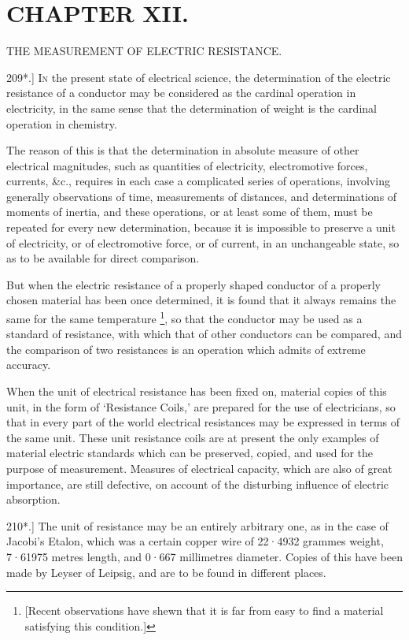 \documentclass[12pt,oneside]{book}[2021/10/04]
\let\oldfootnote\footnote
\renewcommand\footnote[1]{%
\oldfootnote{\hspace{0.14em}#1}}
\newcommand{\Heading}{\centering\normalfont}
\newcommand{\Chapter}[1]{\section*{\large\Heading #1}}
\newcommand{\Subheading}[1]{\begin{center}\small #1 \end{center}}
\newcommand{\article}[1]{\phantomsection \label{art:#1}{#1.]}}
\newcommand{\¬}{\hphantom{0}}
\newcommand{\newchapter}{\newpage\thispagestyle{empty}}
\begin{document}
\newchapter
\Chapter{CHAPTER XII.}
\Subheading{THE MEASUREMENT OF ELECTRIC RESISTANCE.}

\article{209*} \textsc{In} the present state of electrical science, the determination
of the electric resistance of a conductor may be considered
as the cardinal operation in electricity, in the same sense that the
determination of weight is the cardinal operation in chemistry.

The reason of this is that the determination in absolute measure
of other electrical magnitudes, such as quantities of electricity,
electromotive forces, currents, \&c., requires in each case a complicated
series of operations, involving generally observations of
time, measurements of distances, and determinations of moments
of inertia, and these operations, or at least some of them, must be
repeated for every new determination, because it is impossible to preserve
a unit of electricity, or of electromotive force, or of current, in
an unchangeable state, so as to be available for direct comparison.

But when the electric resistance of a properly shaped conductor
of a properly chosen material has been once determined, it is found
that it always remains the same for the same temperature\footnote{
[Recent observations have shewn that it is far from easy to find a material
satisfying this condition.]}, so that
the conductor may be used as a standard of resistance, with which
that of other conductors can be compared, and the comparison of
two resistances is an operation which admits of extreme accuracy.

When the unit of electrical resistance has been fixed on, material
copies of this unit, in the form of `Resistance Coils,' are prepared
for the use of electricians, so that in every part of the world
electrical resistances may be expressed in terms of the same unit.
These unit resistance coils are at present the only examples of
material electric standards which can be preserved, copied, and used
for the purpose of measurement. Measures of electrical capacity,
which are also of great importance, are still defective, on account
of the disturbing influence of electric absorption.

\article{210*} The unit of resistance may be an entirely arbitrary one,
as in the case of Jacobi's Etalon, which was a certain copper
wire of 22·4932 grammes weight, 7·61975 metres length, and 0·667
millimetres diameter. Copies of this have been made by Leyser of
Leipsig, and are to be found in different places.
\end{document}
